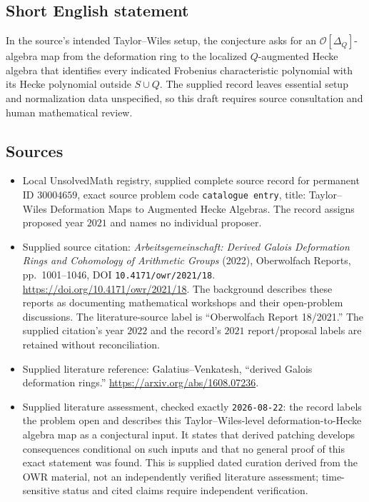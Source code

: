 \documentclass[11pt]{article}
\begin{document}
\subsection{Short English statement}
In the source's intended Taylor--Wiles setup, the conjecture asks for an \(\mathcal O[\Delta_Q]\)-algebra map from the deformation ring to the localized \(Q\)-augmented Hecke algebra that identifies every indicated Frobenius characteristic polynomial with its Hecke polynomial outside \(S\cup Q\). The supplied record leaves essential setup and normalization data unspecified, so this draft requires source consultation and human mathematical review.
\subsection{Sources}
\begin{itemize}
\item Local UnsolvedMath registry, supplied complete source record for permanent ID \(30004659\), exact source problem code \texttt{catalogue entry}, title: Taylor--Wiles Deformation Maps to Augmented Hecke Algebras. The record assigns proposed year \(2021\) and names no individual proposer.
\item Supplied source citation: \emph{Arbeitsgemeinschaft: Derived Galois Deformation Rings and Cohomology of Arithmetic Groups} (2022), Oberwolfach Reports, pp.\ 1001--1046, DOI \texttt{10.4171/owr/2021/18}. \url{https://doi.org/10.4171/owr/2021/18}. The background describes these reports as documenting mathematical workshops and their open-problem discussions. The literature-source label is ``Oberwolfach Report 18/2021.'' The supplied citation's year \(2022\) and the record's \(2021\) report/proposal labels are retained without reconciliation.
\item Supplied literature reference: Galatius--Venkatesh, ``derived Galois deformation rings.'' \url{https://arxiv.org/abs/1608.07236}.
\item Supplied literature assessment, checked exactly \texttt{2026-08-22}: the record labels the problem open and describes this Taylor--Wiles-level deformation-to-Hecke algebra map as a conjectural input. It states that derived patching develops consequences conditional on such inputs and that no general proof of this exact statement was found. This is supplied dated curation derived from the OWR material, not an independently verified literature assessment; time-sensitive status and cited claims require independent verification.
\end{itemize}
\end{document}
